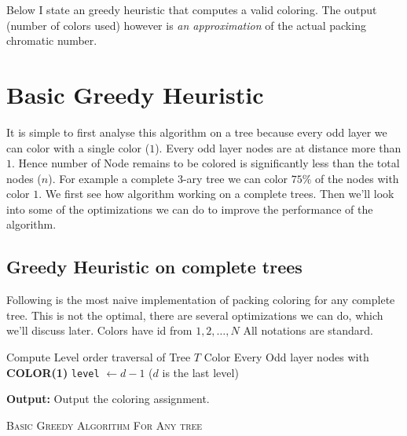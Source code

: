 \documentclass{article}
\theoremstyle{remark}
\begin{document}
Below I state an greedy heuristic that computes a valid coloring. The output (number of colors used) however is \textit{an approximation} of the actual packing chromatic number.
\newpage

\section{Basic Greedy Heuristic}
It is simple to first analyse this algorithm on a tree because every odd layer we can color with a single color ($1$). Every odd layer nodes are at distance more than $1$. Hence number of Node remains to be colored is significantly less than the total nodes ($n$). For example a complete $3$-ary tree we can color $75\%$ of the nodes with color $1$. We first see how algorithm working on a complete trees. Then we'll look into some of the optimizations we can do to improve the performance of the algorithm.

\subsection{Greedy Heuristic on complete trees}
Following is the most naive implementation of packing coloring for any complete tree.
This is not the optimal, there are several optimizations we can do, which we'll discuss later. Colors have id from $1, 2, \dots, N$ All notations are standard.

\begin{algorithm}[H]\label{alg:1}

    \BlankLine
    Compute Level order traversal of Tree $T$\;
    Color Every Odd layer nodes with \textbf{COLOR(1)}\;
    \texttt{level} $\gets d - 1$ ($d$ is the last level)\;

    \textbf{Output:} Output the coloring assignment.

    \caption{\textsc{Basic Greedy Algorithm For Any tree}}
\end{algorithm}
\end{document}
